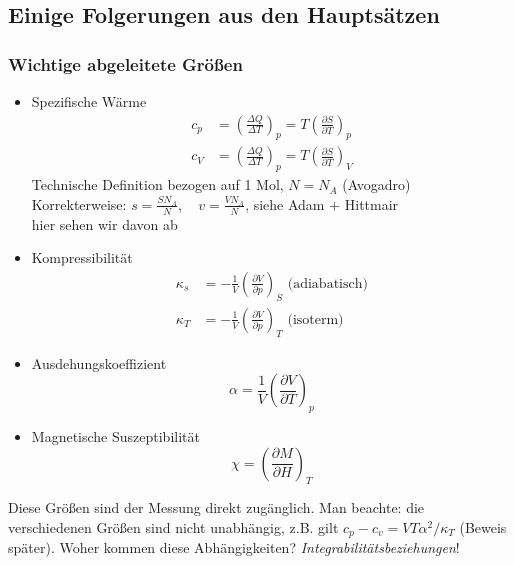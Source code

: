 \subsection{Einige Folgerungen aus den Hauptsätzen}
\subsubsection{Wichtige abgeleitete Größen}
\begin{itemize}
    \item Spezifische Wärme
    \begin{equation}
        \begin{split}
            c_p &= \left( \frac{\Delta Q}{\Delta T} \right)_p = T \left( \frac{\partial S}{\partial T} \right)_p \\
            c_V &= \left( \frac{\Delta Q}{\Delta T} \right)_p = T \left( \frac{\partial S}{\partial T} \right)_V
        \end{split}
    \end{equation}
    Technische Definition bezogen auf 1 Mol, $N=N_A$ (Avogadro) \\
    Korrekterweise: $s = \frac{S N_A}{N}, \quad v = \frac{V N_A}{N}$, siehe Adam + Hittmair \\
    hier sehen wir davon ab
    \item Kompressibilität
    \begin{equation}
        \begin{split}
            \kappa_s &= - \frac{1}{V} \left( \frac{\partial V}{\partial p} \right)_S \text{ (adiabatisch)} \\
            \kappa_T &= - \frac{1}{V} \left( \frac{\partial V}{\partial p} \right)_T \text{ (isoterm)}
        \end{split}
    \end{equation}
    \item Ausdehungskoeffizient
    \begin{equation}
        \alpha = \frac{1}{V} \left( \frac{\partial V}{\partial T} \right)_p
    \end{equation}
    \item Magnetische Suszeptibilität
    \begin{equation}
        \chi = \left( \frac{\partial M}{\partial H} \right)_T
    \end{equation}
\end{itemize}
Diese Größen sind der Messung direkt zugänglich. Man beachte: die verschiedenen Größen sind nicht unabhängig, z.B. gilt
$c_p - c_v = V T \alpha^2 / \kappa_T$ (Beweis später).
Woher kommen diese Abhängigkeiten? \emph{Integrabilitätsbeziehungen}!
